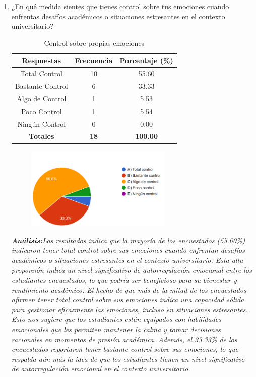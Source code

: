 \documentclass[journal]{IEEEtran}
\begin{document}
\begin{enumerate}
\item ¿En qué medida sientes que tienes control sobre tus emociones cuando enfrentas desafíos académicos o situaciones estresantes en el contexto universitario?
	\begin{table}[H]
		\renewcommand{\arraystretch}{1.3}
		\centering
		\caption{Control sobre propias emociones}
		\begin{tabular}{c c c}
			\hline
			\textbf{Respuestas} & \textbf{Frecuencia} & \textbf{Porcentaje (\%)}\\
			\hline
			Total Control & 10 & 55.60 \\
			Bastante Control & 6 & 33.33 \\
			Algo de Control & 1 & 5.53\\
			Poco Control & 1 & 5.54\\
			Ningún Control & 0 & 0.00\\
			\hline
			\textbf{Totales} &\textbf{18}& \textbf{100.00}\\
			\hline
		\end{tabular}
	\end{table}
	\begin{figure}[H]
		\centering
		\includegraphics[width=07cm]{Pregunta 3}
	\end{figure}
	\textit{\textbf{Análisis:}Los resultados indica que la mayoría de los encuestados (55.60\%) indicaron tener total control sobre sus emociones cuando enfrentan desafíos académicos o situaciones estresantes en el contexto universitario. Esta alta proporción indica un nivel significativo de autorregulación emocional entre los estudiantes encuestados, lo que podría ser beneficioso para su bienestar y rendimiento académico.
El hecho de que más de la mitad de los encuestados afirmen tener total control sobre sus emociones indica una capacidad sólida para gestionar eficazmente las emociones, incluso en situaciones estresantes. Esto nos sugiere que los estudiantes están equipados con habilidades emocionales que les permiten mantener la calma y tomar decisiones racionales en momentos de presión académica.
Además, el 33.33\% de los encuestados reportaron tener bastante control sobre sus emociones, lo que respalda aún más la idea de que los estudiantes tienen un nivel significativo de autorregulación emocional en el contexto universitario.
}\\


\end{enumerate}
\end{document}
